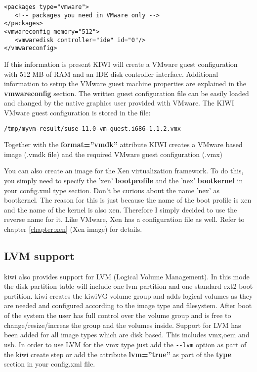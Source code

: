 \begin{Command}{13cm}
\begin{verbatim}
<packages type="vmware">
   <!-- packages you need in VMware only -->
</packages>
<vmwareconfig memory="512">
   <vmwaredisk controller="ide" id="0"/>
</vmwareconfig>
\end{verbatim}
\end{Command}

If this information is present KIWI will create a VMware guest
configuration with 512 MB of RAM and an IDE disk controller interface.
Additional information to setup the VMware guest machine properties are
explained in the \textbf{vmwareconfig} section. The written guest
configuration file can be easily loaded and changed by the native
graphics user provided with VMware. The KIWI VMware guest configuration
is stored in the file:

\begin{Command}{13cm}
\begin{verbatim}
/tmp/myvm-result/suse-11.0-vm-guest.i686-1.1.2.vmx
\end{verbatim}
\end{Command}

Together with the \textbf{format=''vmdk''} attribute KIWI creates
a VMware based image (.vmdk file) and the required VMware guest
configuration (.vmx)

You can also create an image for the Xen virtualization framework.  To do this,
you simply need to specify the 'xen' \textbf{bootprofile} and
the 'nex' \textbf{bootkernel} in your config.xml type section. Don't be
curious about the name 'nex' as bootkernel. The reason for this is just because the name of the boot profile is xen and the name of the kernel is also xen.
Therefore I simply decided to use the reverse name for it. Like VMware,
Xen has a configuration file as well. Refer to chapter
\ref{chapter:xen} (Xen image) for details.

\subsection{LVM support}

kiwi also provides support for LVM (Logical Volume Management). In this
mode the disk partition table will include one lvm partition and one
standard ext2 boot partition. kiwi creates the kiwiVG volume group and
adds logical volumes as they are needed and configured according to the
image type and filesystem. After boot of the system the user has full
control over the volume group and is free to change/resize/increas the
group and the volumes inside. Support for LVM has been added for all
image types which are disk based. This includes vmx,oem and usb.
In order to use LVM for the vmx type just add the \verb+--lvm+ option
as part of the kiwi create step or add the attribute \textbf{lvm=''true''}
as part of the \textbf{type} section in your config.xml file.

